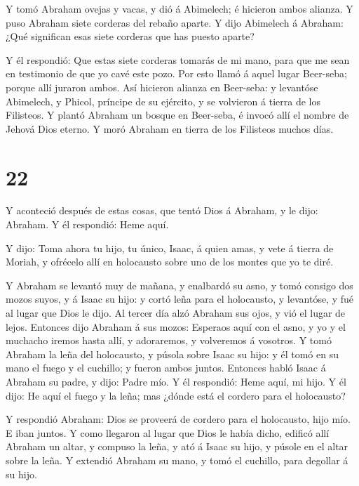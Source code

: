  Y tomó Abraham ovejas y vacas, y dió á Abimelech; é
hicieron ambos alianza.  Y puso Abraham siete corderas del
rebaño aparte.  Y dijo Abimelech á Abraham: ¿Qué significan
esas siete corderas que has puesto aparte?

 Y él respondió: Que estas siete corderas tomarás de mi
mano, para que me sean en testimonio de que yo cavé este pozo.
 Por esto llamó á aquel lugar Beer-seba; porque allí
juraron ambos.  Así hicieron alianza en Beer-seba: y
levantóse Abimelech, y Phicol, príncipe de su ejército, y se volvieron á
tierra de los Filisteos.  Y plantó Abraham un bosque en
Beer-seba, é invocó allí el nombre de Jehová Dios eterno. 
Y moró Abraham en tierra de los Filisteos muchos días.

\hypertarget{section-21}{%
\section{22}\label{section-21}}

 Y aconteció después de estas cosas, que tentó Dios á
Abraham, y le dijo: Abraham. Y él respondió: Heme aquí.

 Y dijo: Toma ahora tu hijo, tu único, Isaac, á quien amas,
y vete á tierra de Moriah, y ofrécelo allí en holocausto sobre uno de
los montes que yo te diré.

 Y Abraham se levantó muy de mañana, y enalbardó su asno, y
tomó consigo dos mozos suyos, y á Isaac su hijo: y cortó leña para el
holocausto, y levantóse, y fué al lugar que Dios le dijo. 
Al tercer día alzó Abraham sus ojos, y vió el lugar de lejos.
 Entonces dijo Abraham á sus mozos: Esperaos aquí con el
asno, y yo y el muchacho iremos hasta allí, y adoraremos, y volveremos á
vosotros.  Y tomó Abraham la leña del holocausto, y púsola
sobre Isaac su hijo: y él tomó en su mano el fuego y el cuchillo; y
fueron ambos juntos.  Entonces habló Isaac á Abraham su
padre, y dijo: Padre mío. Y él respondió: Heme aquí, mi hijo. Y él dijo:
He aquí el fuego y la leña; mas ¿dónde está el cordero para el
holocausto?

 Y respondió Abraham: Dios se proveerá de cordero para el
holocausto, hijo mío. E iban juntos.  Y como llegaron al
lugar que Dios le había dicho, edificó allí Abraham un altar, y compuso
la leña, y ató á Isaac su hijo, y púsole en el altar sobre la leña.
 Y extendió Abraham su mano, y tomó el cuchillo, para
degollar á su hijo.

